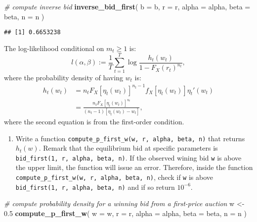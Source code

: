 \documentclass[
]{book}
\newenvironment{Shaded}{\begin{snugshade}}{\end{snugshade}}
\newcommand{\AttributeTok}[1]{\textcolor[rgb]{0.13,0.29,0.53}{#1}}
\newcommand{\CommentTok}[1]{\textcolor[rgb]{0.56,0.35,0.01}{\textit{#1}}}
\newcommand{\FloatTok}[1]{\textcolor[rgb]{0.00,0.00,0.81}{#1}}
\newcommand{\FunctionTok}[1]{\textcolor[rgb]{0.13,0.29,0.53}{\textbf{#1}}}
\newcommand{\NormalTok}[1]{#1}
\newcommand{\OtherTok}[1]{\textcolor[rgb]{0.56,0.35,0.01}{#1}}
\providecommand{\tightlist}{%
  \setlength{\itemsep}{0pt}\setlength{\parskip}{0pt}}
\begin{document}
\begin{Shaded}
\begin{Highlighting}[]
\CommentTok{\# compute inverse bid}
\FunctionTok{inverse\_bid\_first}\NormalTok{(}
  \AttributeTok{b =}\NormalTok{ b, }
  \AttributeTok{r =}\NormalTok{ r,}
  \AttributeTok{alpha =}\NormalTok{ alpha,}
  \AttributeTok{beta =}\NormalTok{ beta,}
  \AttributeTok{n =}\NormalTok{ n}
\NormalTok{  )}
\end{Highlighting}
\end{Shaded}

\begin{verbatim}
## [1] 0.6653238
\end{verbatim}

The log-likelihood conditional on \(m_t \ge 1\) is:
\[
l(\alpha, \beta) := \frac{1}{T}\sum_{t = 1}^T \log \frac{h_t(w_t)}{1 - F_X(r_t)^{n_t}},
\]
where the probability density of having \(w_t\) is:
\[
\begin{split}
h_t(w_t) &= n_t F_X[\eta_t(w_t)]^{n_t - 1} f_X[\eta_t(w_t)] \eta_t'(w_t)\\
&= \frac{n_t F_X[\eta_t(w_t)]^{n_t}}{(n_t - 1)[\eta_t(w_t) - w_t]},
\end{split}
\]
where the second equation is from the first-order condition.

\begin{enumerate}
\def\labelenumi{\arabic{enumi}.}
\setcounter{enumi}{5}
\tightlist
\item
  Write a function \texttt{compute\_p\_first\_w(w,\ r,\ alpha,\ beta,\ n)} that returns \(h_t(w)\). Remark that the equilibrium bid at specific parameters is \texttt{bid\_first(1,\ r,\ alpha,\ beta,\ n)}. If the observed wining bid \texttt{w} is above the upper limit, the function will issue an error. Therefore, inside the function \texttt{compute\_p\_first\_w(w,\ r,\ alpha,\ beta,\ n)}, check if \texttt{w} is above \texttt{bid\_first(1,\ r,\ alpha,\ beta,\ n)} and if so return \(10^{-6}\).
\end{enumerate}

\begin{Shaded}
\begin{Highlighting}[]
\CommentTok{\# compute probability density for a winning bid from a first{-}price auction}
\NormalTok{w }\OtherTok{\textless{}{-}} \FloatTok{0.5}
\FunctionTok{compute\_p\_first\_w}\NormalTok{(}
  \AttributeTok{w =}\NormalTok{ w, }
  \AttributeTok{r =}\NormalTok{ r, }
  \AttributeTok{alpha =}\NormalTok{ alpha, }
  \AttributeTok{beta =}\NormalTok{ beta, }
  \AttributeTok{n =}\NormalTok{ n}
\NormalTok{  )}
\end{Highlighting}
\end{Shaded}
\end{document}
